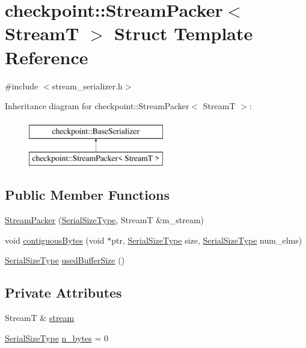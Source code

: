 \hypertarget{structcheckpoint_1_1_stream_packer}{}\section{checkpoint\+:\+:Stream\+Packer$<$ StreamT $>$ Struct Template Reference}
\label{structcheckpoint_1_1_stream_packer}


{\ttfamily \#include $<$stream\+\_\+serializer.\+h$>$}

Inheritance diagram for checkpoint\+:\+:Stream\+Packer$<$ StreamT $>$\+:\begin{figure}[H]
\begin{center}
\leavevmode
\includegraphics[height=2.000000cm]{structcheckpoint_1_1_stream_packer}
\end{center}
\end{figure}
\subsection*{Public Member Functions}
\begin{DoxyCompactItemize}
\item 
\hyperlink{structcheckpoint_1_1_stream_packer_a5308ba62ab4031a110c92c37718f7767}{Stream\+Packer} (\hyperlink{namespacecheckpoint_a083f6674da3f94c2901b18c6d238217c}{Serial\+Size\+Type}, StreamT \&m\+\_\+stream)
\item 
void \hyperlink{structcheckpoint_1_1_stream_packer_a9f089858b3aa248db20827c0cb0b6b40}{contiguous\+Bytes} (void $\ast$ptr, \hyperlink{namespacecheckpoint_a083f6674da3f94c2901b18c6d238217c}{Serial\+Size\+Type} size, \hyperlink{namespacecheckpoint_a083f6674da3f94c2901b18c6d238217c}{Serial\+Size\+Type} num\+\_\+elms)
\item 
\hyperlink{namespacecheckpoint_a083f6674da3f94c2901b18c6d238217c}{Serial\+Size\+Type} \hyperlink{structcheckpoint_1_1_stream_packer_abead4394e66814a9890348650125cdad}{used\+Buffer\+Size} ()
\end{DoxyCompactItemize}
\subsection*{Private Attributes}
\begin{DoxyCompactItemize}
\item 
StreamT \& \hyperlink{structcheckpoint_1_1_stream_packer_aa5b89dd441e15eb18b8ab65b0b39f471}{stream}
\item 
\hyperlink{namespacecheckpoint_a083f6674da3f94c2901b18c6d238217c}{Serial\+Size\+Type} \hyperlink{structcheckpoint_1_1_stream_packer_aef2aecbc78b2eb2acec0e2fa6773f16a}{n\+\_\+bytes} = 0
\end{DoxyCompactItemize}
